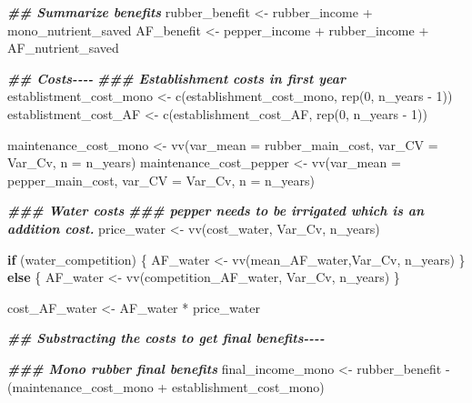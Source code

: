 \documentclass[
]{article}
\newenvironment{Shaded}{\begin{snugshade}}{\end{snugshade}}
\newcommand{\AttributeTok}[1]{\textcolor[rgb]{0.77,0.63,0.00}{#1}}
\newcommand{\ControlFlowTok}[1]{\textcolor[rgb]{0.13,0.29,0.53}{\textbf{#1}}}
\newcommand{\DecValTok}[1]{\textcolor[rgb]{0.00,0.00,0.81}{#1}}
\newcommand{\DocumentationTok}[1]{\textcolor[rgb]{0.56,0.35,0.01}{\textbf{\textit{#1}}}}
\newcommand{\FunctionTok}[1]{\textcolor[rgb]{0.00,0.00,0.00}{#1}}
\newcommand{\NormalTok}[1]{#1}
\newcommand{\OtherTok}[1]{\textcolor[rgb]{0.56,0.35,0.01}{#1}}
\newcommand{\SpecialCharTok}[1]{\textcolor[rgb]{0.00,0.00,0.00}{#1}}
\begin{document}
\begin{Shaded}
\begin{Highlighting}[]
\DocumentationTok{\#\# Summarize benefits}
\NormalTok{  rubber\_benefit }\OtherTok{\textless{}{-}}\NormalTok{ rubber\_income }\SpecialCharTok{+}\NormalTok{ mono\_nutrient\_saved}
\NormalTok{  AF\_benefit }\OtherTok{\textless{}{-}}\NormalTok{ pepper\_income }\SpecialCharTok{+}\NormalTok{ rubber\_income }\SpecialCharTok{+}\NormalTok{ AF\_nutrient\_saved}
  

\DocumentationTok{\#\# Costs{-}{-}{-}{-}}
  \DocumentationTok{\#\#\# Establishment costs in first year}
\NormalTok{  establistment\_cost\_mono }\OtherTok{\textless{}{-}} \FunctionTok{c}\NormalTok{(establishment\_cost\_mono, }\FunctionTok{rep}\NormalTok{(}\DecValTok{0}\NormalTok{, n\_years }\SpecialCharTok{{-}} \DecValTok{1}\NormalTok{))}
\NormalTok{  establistment\_cost\_AF }\OtherTok{\textless{}{-}} \FunctionTok{c}\NormalTok{(establishment\_cost\_AF, }\FunctionTok{rep}\NormalTok{(}\DecValTok{0}\NormalTok{, n\_years }\SpecialCharTok{{-}} \DecValTok{1}\NormalTok{))}
  
\NormalTok{  maintenance\_cost\_mono }\OtherTok{\textless{}{-}} \FunctionTok{vv}\NormalTok{(}\AttributeTok{var\_mean =}\NormalTok{ rubber\_main\_cost, }\AttributeTok{var\_CV =}\NormalTok{ Var\_Cv,}
                              \AttributeTok{n =}\NormalTok{ n\_years)}
\NormalTok{  maintenance\_cost\_pepper }\OtherTok{\textless{}{-}} \FunctionTok{vv}\NormalTok{(}\AttributeTok{var\_mean =}\NormalTok{ pepper\_main\_cost, }\AttributeTok{var\_CV =}\NormalTok{ Var\_Cv,}
                              \AttributeTok{n =}\NormalTok{ n\_years)}
  
  
  \DocumentationTok{\#\#\# Water costs}
  \DocumentationTok{\#\#\# pepper needs to be irrigated which is an addition cost.}
\NormalTok{  price\_water }\OtherTok{\textless{}{-}} \FunctionTok{vv}\NormalTok{(cost\_water, Var\_Cv, n\_years)}
  
  \ControlFlowTok{if}\NormalTok{ (water\_competition) \{}
\NormalTok{    AF\_water }\OtherTok{\textless{}{-}} \FunctionTok{vv}\NormalTok{(mean\_AF\_water,Var\_Cv, n\_years)}
\NormalTok{  \} }\ControlFlowTok{else}\NormalTok{ \{}
\NormalTok{    AF\_water }\OtherTok{\textless{}{-}} \FunctionTok{vv}\NormalTok{(competition\_AF\_water, Var\_Cv, n\_years)}
\NormalTok{  \}}
    
\NormalTok{  cost\_AF\_water }\OtherTok{\textless{}{-}}\NormalTok{ AF\_water }\SpecialCharTok{*}\NormalTok{ price\_water}
  
  
  \DocumentationTok{\#\# Substracting the costs to get final benefits{-}{-}{-}{-}}
  
  \DocumentationTok{\#\#\# Mono rubber final benefits}
\NormalTok{  final\_income\_mono }\OtherTok{\textless{}{-}}\NormalTok{ rubber\_benefit }\SpecialCharTok{{-}}\NormalTok{ (maintenance\_cost\_mono }\SpecialCharTok{+}\NormalTok{ establishment\_cost\_mono)}
    

\end{Highlighting}
\end{Shaded}
\end{document}
